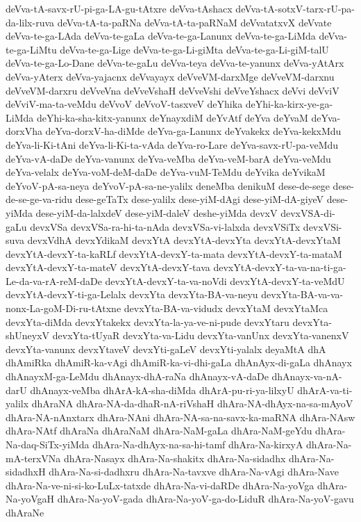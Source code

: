 {deVva-tA-savx-rU-pi-ga-LA-gu-tAtxre
deVva-tAshacx
deVva-tA-sotxV-tarx-rU-pa-da-lilx-ruva
deVva-tA-ta-paRNa
deVva-tA-ta-paRNaM
deVvatatxvX
deVvate
deVva-te-ga-LAda
deVva-te-gaLa
deVva-te-ga-Lanunx
deVva-te-ga-LiMda
deVva-te-ga-LiMtu
deVva-te-ga-Lige
deVva-te-ga-Li-giMta
deVva-te-ga-Li-giM-talU
deVva-te-ga-Lo-Dane
deVva-te-gaLu
deVva-teya
deVva-te-yanunx
deVva-yAtArx
deVva-yAterx
deVva-yajacnx
deVvayayx
deVveVM-darxMge
deVveVM-darxnu
deVveVM-darxru
deVveVna
deVveVshaH
deVveVshi
deVveYshacx
deVvi
deVviV
deVviV-ma-ta-veMdu
deVvoV
deVvoV-tasxveV
deYhika
deYhi-ka-kirx-ye-ga-LiMda
deYhi-ka-sha-kitx-yanunx
deYnayxdiM
deYvAtf
deYva
deYvaM
deYva-dorxVha
deYva-dorxV-ha-diMde
deYva-ga-Lanunx
deYvakekx
deYva-kekxMdu
deYva-li-Ki-tAni
deYva-li-Ki-ta-vAda
deYva-ro-Lare
deYva-savx-rU-pa-veMdu
deYva-vA-daDe
deYva-vanunx
deYva-veMba
deYva-veM-barA
deYva-veMdu
deYva-velalx
deYva-voM-deM-daDe
deYva-vuM-TeMdu
deYvika
deYvikaM
deYvoV-pA-sa-neya
deYvoV-pA-sa-ne-yalilx
deneMba
denikuM
dese-de-sege
dese-de-se-ge-va-ridu
dese-geTaTx
dese-yalilx
dese-yiM-dAgi
dese-yiM-dA-giyeV
dese-yiMda
dese-yiM-da-lalxdeV
dese-yiM-daleV
deshe-yiMda
devxV
devxVSA-di-gaLu
devxVSa
devxVSa-ra-hi-ta-nAda
devxVSa-vi-lalxda
devxVSiTx
devxVSi-suva
devxVdhA
devxYdikaM
devxYtA
devxYtA-devxYta
devxYtA-devxYtaM
devxYtA-devxY-ta-kaRLf
devxYtA-devxY-ta-mata
devxYtA-devxY-ta-mataM
devxYtA-devxY-ta-mateV
devxYtA-devxY-tava
devxYtA-devxY-ta-va-na-ti-ga-Le-da-va-rA-reM-daDe
devxYtA-devxY-ta-va-noVdi
devxYtA-devxY-ta-veMdU
devxYtA-devxY-ti-ga-Lelalx
devxYta
devxYta-BA-va-neyu
devxYta-BA-va-va-nonx-La-goM-Di-ru-tAtxne
devxYta-BA-va-vidudx
devxYtaM
devxYtaMca
devxYta-diMda
devxYtakekx
devxYta-la-ya-ve-ni-pude
devxYtaru
devxYta-shUneyxV
devxYta-tUyaR
devxYta-va-Lidu
devxYta-vanUnx
devxYta-vanenxV
devxYta-vanunx
devxYtaveV
devxYti-gaLeV
devxYti-yalalx
deyaMtA
dhA
dhAmiRka
dhAmiR-ka-vAgi
dhAmiR-ka-vi-dhi-gaLa
dhAnAyx-di-gaLa
dhAnayx
dhAnayxM-ga-LeMdu
dhAnayx-dhA-raNa
dhAnayx-vA-daDe
dhAnayx-va-nA-darU
dhAnayx-veMba
dhArA-kA-sha-diMda
dhArA-pu-ri-ya-lilxyU
dhArA-va-ti-yalilx
dhAraNA
dhAra-NA-da-dhaR-nA-riVshaH
dhAra-NA-dhAyx-na-sa-mAyoV
dhAra-NA-nAnxtarx
dhAra-NAni
dhAra-NA-sa-na-savx-ka-maRNA
dhAra-NAsw
dhAra-NAtf
dhAraNa
dhAraNaM
dhAra-NaM-gaLa
dhAra-NaM-geYdu
dhAra-Na-daq-SiTx-yiMda
dhAra-Na-dhAyx-na-sa-hi-tamf
dhAra-Na-kirxyA
dhAra-Na-mA-terxVNa
dhAra-Nasayx
dhAra-Na-shakitx
dhAra-Na-sidadhx
dhAra-Na-sidadhxH
dhAra-Na-si-dadhxru
dhAra-Na-tavxve
dhAra-Na-vAgi
dhAra-Nave
dhAra-Na-ve-ni-si-ko-LuLx-tatxde
dhAra-Na-vi-daRDe
dhAra-Na-yoVga
dhAra-Na-yoVgaH
dhAra-Na-yoV-gada
dhAra-Na-yoV-ga-do-LiduR
dhAra-Na-yoV-gavu
dhAraNe
}
